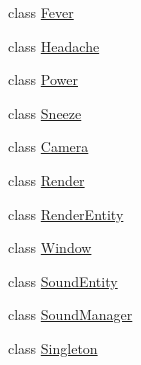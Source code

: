 \begin{DoxyCompactItemize}
class \hyperlink{class_symp_1_1_fever}{Fever}
\item 
class \hyperlink{class_symp_1_1_headache}{Headache}
\item 
class \hyperlink{class_symp_1_1_power}{Power}
\item 
class \hyperlink{class_symp_1_1_sneeze}{Sneeze}
\item 
class \hyperlink{class_symp_1_1_camera}{Camera}
\item 
class \hyperlink{class_symp_1_1_render}{Render}
\item 
class \hyperlink{class_symp_1_1_render_entity}{Render\-Entity}
\item 
class \hyperlink{class_symp_1_1_window}{Window}
\item 
class \hyperlink{class_symp_1_1_sound_entity}{Sound\-Entity}
\item 
class \hyperlink{class_symp_1_1_sound_manager}{Sound\-Manager}
\item 
class \hyperlink{class_symp_1_1_singleton}{Singleton}
\end{DoxyCompactItemize}
